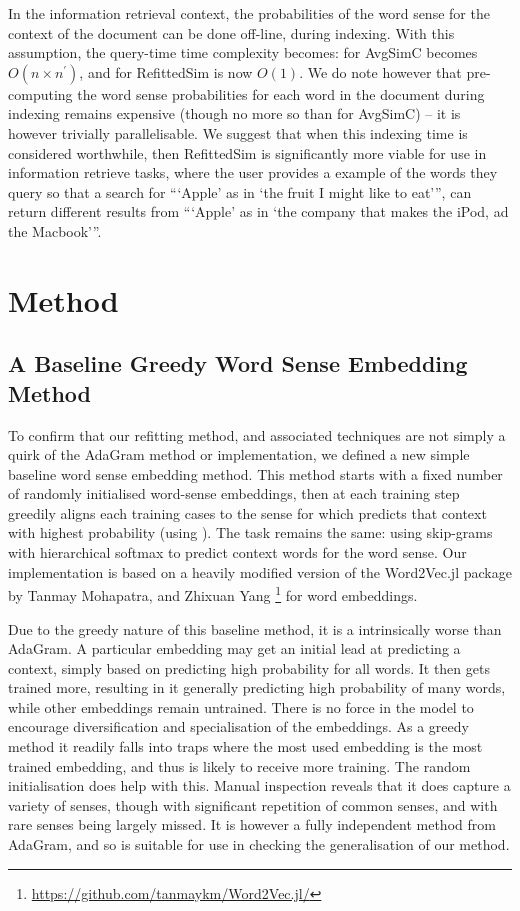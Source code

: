 \documentclass{sig-alternate}
\begin{document}
In the information retrieval context, the probabilities of the word sense for the context of the document can be done off-line, during indexing. With this assumption, the query-time time complexity becomes: for AvgSimC becomes $O(n\times n^{\prime})$, and for RefittedSim is now $O(1)$.
We do note however that pre-computing the word sense probabilities for each word in the document during indexing remains expensive (though no more so than for AvgSimC) -- it is however trivially parallelisable. We suggest that when this indexing time is considered worthwhile, then RefittedSim is significantly more viable for use in information retrieve tasks, where the user provides a example of the words they query so that a search for \enquote{\enquote{Apple} as in \enquote{the fruit I might like to eat}}, can return different results from \enquote{\enquote{Apple} as in \enquote{the company that makes the iPod, ad the Macbook}}.


\section{Method} \label{method}


\subsection{A Baseline Greedy Word Sense Embedding Method}

To confirm that our refitting method, and associated techniques are not simply a quirk of the AdaGram method or implementation, we defined a new simple baseline word sense embedding method.
This method starts with a fixed number of randomly initialised word-sense embeddings, then at each training step greedily aligns each training cases to the sense for which predicts that context with highest probability (using ). The task remains the same: using skip-grams with hierarchical softmax to predict context words for the word sense.
Our implementation is based on a heavily modified version of the Word2Vec.jl package by Tanmay Mohapatra, and Zhixuan Yang \footnote{\url{https://github.com/tanmaykm/Word2Vec.jl/}} for word embeddings.

Due to the greedy nature of this baseline method, it is a intrinsically worse than AdaGram. A particular embedding may get an initial lead at predicting a context, simply based on predicting high probability for all words. It then gets trained more, resulting in it generally predicting high probability of many words, while other embeddings remain untrained. There is no force in the model to encourage diversification and specialisation of the embeddings. As a greedy method it readily falls into traps where the most used embedding is the most trained embedding, and thus is likely to receive more training. The random initialisation does help with this. Manual inspection reveals that it does capture a variety of senses, though with significant repetition of common senses, and with rare senses being largely missed. It is however a fully independent method from AdaGram, and so is suitable for use in checking the generalisation of our method.
\end{document}
